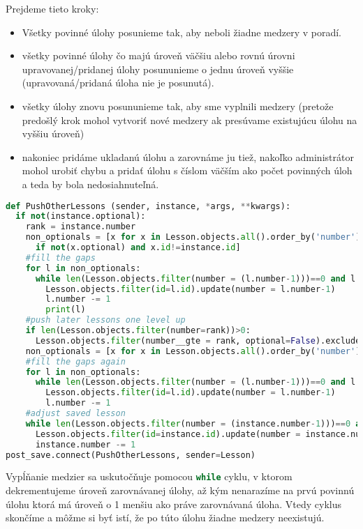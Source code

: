 Prejdeme tieto kroky:
\begin{itemize}
\item Všetky povinné úlohy posunieme tak, aby neboli žiadne medzery v poradí.
\item všetky povinné úlohy čo majú úroveň väčšiu alebo rovnú úrovni upravovanej/pridanej
 úlohy posununieme o jednu úroveň vyššie (upravovaná/pridaná úloha nie je posunutá).
\item všetky úlohy znovu posununieme tak, aby sme vyplnili medzery (pretože predošlý krok mohol
    vytvoriť nové medzery ak presúvame existujúcu úlohu na vyššiu úroveň)
\item nakoniec pridáme ukladanú úlohu a zarovnáme ju tiež, nakoľko administrátor mohol urobiť chybu a pridať úlohu
    s číslom väčším ako počet povinných úloh a teda by bola nedosiahnuteľná.
\end{itemize}

\begin{lstlisting}[language=Python]
def PushOtherLessons (sender, instance, *args, **kwargs):
  if not(instance.optional):
    rank = instance.number
    non_optionals = [x for x in Lesson.objects.all().order_by('number')
      if not(x.optional) and x.id!=instance.id]
    #fill the gaps
    for l in non_optionals:
      while len(Lesson.objects.filter(number = (l.number-1)))==0 and l.number>1:
        Lesson.objects.filter(id=l.id).update(number = l.number-1)
        l.number -= 1
        print(l)
    #push later lessons one level up
    if len(Lesson.objects.filter(number=rank))>0:
      Lesson.objects.filter(number__gte = rank, optional=False).exclude(id=instance.id).update(number = F('number')+1)
    non_optionals = [x for x in Lesson.objects.all().order_by('number') if not(x.optional) and x.id!=instance.id]
    #fill the gaps again
    for l in non_optionals:
      while len(Lesson.objects.filter(number = (l.number-1)))==0 and l.number>1:
        Lesson.objects.filter(id=l.id).update(number = l.number-1)
        l.number -= 1
    #adjust saved lesson
    while len(Lesson.objects.filter(number = (instance.number-1)))==0 and instance.number>1:
      Lesson.objects.filter(id=instance.id).update(number = instance.number-1)
      instance.number -= 1
post_save.connect(PushOtherLessons, sender=Lesson)
\end{lstlisting}

Vypĺňanie medzier sa uskutočňuje pomocou \lstinline[language=Python]{while} cyklu,
v ktorom dekrementujeme úroveň zarovnávanej úlohy, až kým nenarazíme na prvú povinnú úlohu ktorá má
úroveň o 1 menšiu ako práve zarovnávaná úloha. Vtedy cyklus skončíme a môžme si byť istí,
že po túto úlohu žiadne medzery neexistujú.

